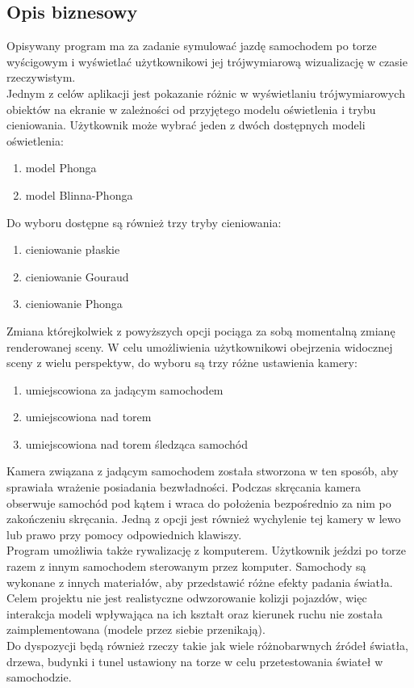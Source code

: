 \documentclass[10pt,a4paper]{article}
\begin{document}
\subsection{Opis biznesowy}
Opisywany program ma za zadanie symulować jazdę samochodem po torze wyścigowym i wyświetlać użytkownikowi jej trójwymiarową wizualizację w czasie rzeczywistym.\\[\baselineskip]
Jednym z celów aplikacji jest pokazanie różnic w wyświetlaniu trójwymiarowych obiektów na ekranie w zależności od przyjętego modelu oświetlenia i trybu cieniowania. Użytkownik może wybrać jeden z dwóch dostępnych modeli oświetlenia:
\begin{enumerate}
	\item model Phonga
	\item model Blinna-Phonga
\end{enumerate}
Do wyboru dostępne są również trzy tryby cieniowania:
\begin{enumerate}
	\item cieniowanie płaskie
	\item cieniowanie Gouraud
	\item cieniowanie Phonga
\end{enumerate}
Zmiana którejkolwiek z powyższych opcji pociąga za sobą momentalną zmianę renderowanej sceny. W celu umożliwienia użytkownikowi obejrzenia widocznej sceny z wielu perspektyw, do wyboru są trzy różne ustawienia kamery:
\begin{enumerate}
	\item umiejscowiona za jadącym samochodem
	\item umiejscowiona nad torem
	\item umiejscowiona nad torem śledząca samochód
\end{enumerate}
Kamera związana z jadącym samochodem została stworzona w ten sposób, aby sprawiała wrażenie posiadania bezwładności. Podczas skręcania kamera obserwuje samochód pod kątem i wraca do położenia bezpośrednio za nim po zakończeniu skręcania. Jedną z opcji jest również wychylenie tej kamery w lewo lub prawo przy pomocy odpowiednich klawiszy.\\[\baselineskip]
Program umożliwia także rywalizację z komputerem. Użytkownik jeździ po torze razem z innym samochodem sterowanym przez komputer. Samochody są wykonane z innych materiałów, aby przedstawić różne efekty padania światła. Celem projektu nie jest realistyczne odwzorowanie kolizji pojazdów, więc interakcja modeli wpływająca na ich kształt oraz kierunek ruchu nie została zaimplementowana (modele przez siebie przenikają).\\[\baselineskip]
Do dyspozycji będą również rzeczy takie jak wiele różnobarwnych źródeł światła, drzewa, budynki i tunel ustawiony na torze w celu przetestowania świateł w samochodzie.
\end{document}
